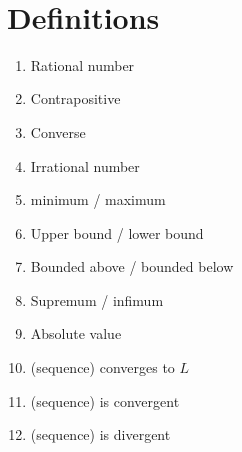 \documentclass[12pt]{amsart}
\begin{document}

\

\section*{Definitions}

\begin{enumerate}
	\item Rational number
	\item Contrapositive
	\item Converse
	\item Irrational number
	\item minimum / maximum
	\item Upper bound / lower bound
	\item Bounded above / bounded below
	\item Supremum / infimum

	\item Absolute value
	\item (sequence) converges to $L$

	\item (sequence) is convergent
	\item (sequence) is divergent
	\begin{comment}
	\item increasing / decreasing sequence
	\item strictly increasing / decreasing sequence
	\item monotone sequence
	\item diverges to $\infty$ or $-\infty$				
	\item Subsequence
	

	\item Cauchy sequence

	\item Limit of a function

	\item Continuous at a point
				\item Continuous on an open interval
	\item Continuous on a closed interval
	
	\item Differentiable
	\item Derivative (at a point)
	\item Derivative (function)
		\item Increasing/decreasing function
\end{comment}
\end{enumerate}
\end{document}
